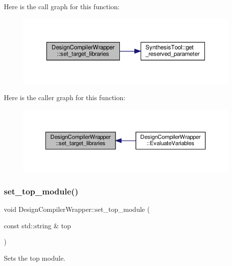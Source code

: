 Here is the call graph for this function\+:
\nopagebreak
\begin{figure}[H]
\begin{center}
\leavevmode
\includegraphics[width=347pt]{d5/d55/classDesignCompilerWrapper_adeb66be707eda10cd2fd96db1172f264_cgraph}
\end{center}
\end{figure}
Here is the caller graph for this function\+:
\nopagebreak
\begin{figure}[H]
\begin{center}
\leavevmode
\includegraphics[width=350pt]{d5/d55/classDesignCompilerWrapper_adeb66be707eda10cd2fd96db1172f264_icgraph}
\end{center}
\end{figure}
\mbox{\label{classDesignCompilerWrapper_a09068be079cba1f62979d528457408cb}} 
\subsubsection{\texorpdfstring{set\+\_\+top\+\_\+module()}{set\_top\_module()}}
{\footnotesize\ttfamily void Design\+Compiler\+Wrapper\+::set\+\_\+top\+\_\+module (\begin{DoxyParamCaption}\item[{const std\+::string \&}]{top }\end{DoxyParamCaption})}



Sets the top module. 



